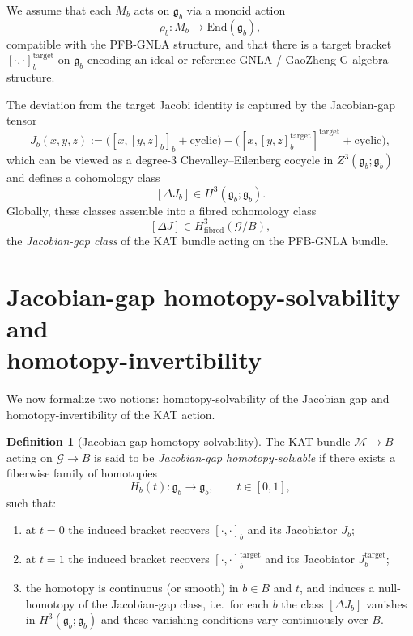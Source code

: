 \documentclass[11pt]{book}
\theoremstyle{plain}
\theoremstyle{definition}
\newtheorem{definition}[theorem]{Definition}
\theoremstyle{remark}
\begin{document}
We assume that each $M_b$ acts on $\mathfrak{g}_b$ via a monoid
action
\[
  \rho_b : M_b \to \mathrm{End}(\mathfrak{g}_b),
\]
compatible with the PFB-GNLA structure, and that there is a target
bracket $[\cdot,\cdot]_b^{\mathrm{target}}$ on $\mathfrak{g}_b$ encoding
an ideal or reference GNLA / GaoZheng G-algebra structure.

The deviation from the target Jacobi identity is captured by the
Jacobian-gap tensor
\[
  J_b(x,y,z)
  :=
  \bigl(
    [x,[y,z]_b]_b + \text{cyclic}
  \bigr)
  -
  \bigl(
    [x,[y,z]_b^{\mathrm{target}}]^{\mathrm{target}}
    + \text{cyclic}
  \bigr),
\]
which can be viewed as a degree-$3$ Chevalley--Eilenberg cocycle in
$Z^3(\mathfrak{g}_b;\mathfrak{g}_b)$ and defines a cohomology class
\[
  [\Delta J_b] \in H^3(\mathfrak{g}_b;\mathfrak{g}_b).
\]
Globally, these classes assemble into a fibred cohomology class
\[
  [\Delta J] \in H^3_{\mathrm{fibred}}(\mathcal{G}/B),
\]
the \emph{Jacobian-gap class} of the KAT bundle acting on the PFB-GNLA
bundle.

\section[Jacobian-gap homotopy-solvability and homotopy-invertibility]{Jacobian-gap homotopy-solvability and\\homotopy-invertibility}

We now formalize two notions: homotopy-solvability of the Jacobian gap
and homotopy-invertibility of the KAT action.

\begin{definition}[Jacobian-gap homotopy-solvability]
The KAT bundle $\mathcal{M}\to B$ acting on $\mathcal{G}\to B$ is said
to be \emph{Jacobian-gap homotopy-solvable} if there exists a
fiberwise family of homotopies
\[
  H_b(t) : \mathfrak{g}_b \to \mathfrak{g}_b,
  \qquad t\in[0,1],
\]
such that:
\begin{enumerate}[label=(\roman*)]
  \item at $t=0$ the induced bracket recovers $[\cdot,\cdot]_b$ and its
        Jacobiator $J_b$;
  \item at $t=1$ the induced bracket recovers
        $[\cdot,\cdot]_b^{\mathrm{target}}$ and its Jacobiator
        $J_b^{\mathrm{target}}$;
  \item the homotopy is continuous (or smooth) in $b\in B$ and $t$, and
        induces a null-homotopy of the Jacobian-gap class, i.e.\ for
        each $b$ the class $[\Delta J_b]$ vanishes in
        $H^3(\mathfrak{g}_b;\mathfrak{g}_b)$ and these vanishing
        conditions vary continuously over $B$.
\end{enumerate}
\end{definition}
\end{document}
